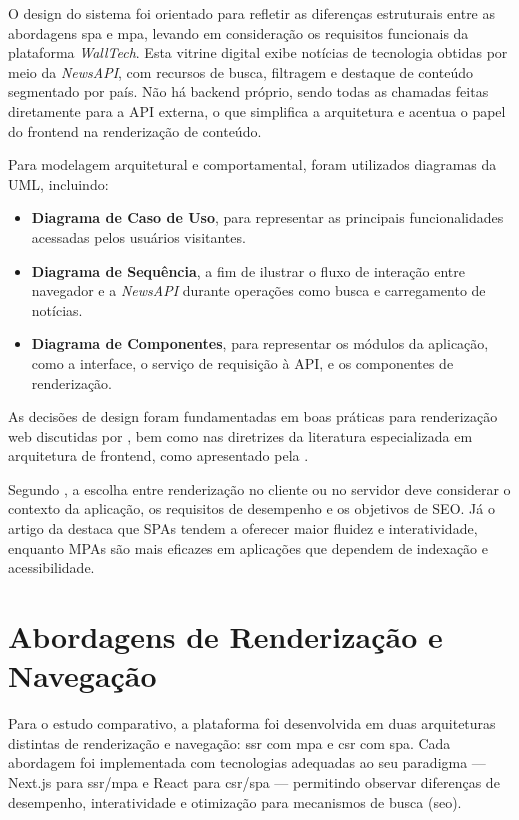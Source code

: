 O design do sistema foi orientado para refletir as diferenças estruturais entre as abordagens \acrshort{spa} e \acrshort{mpa}, levando em consideração os requisitos funcionais da plataforma \textit{WallTech}. Esta vitrine digital exibe notícias de tecnologia obtidas por meio da \textit{NewsAPI}, com recursos de busca, filtragem e destaque de conteúdo segmentado por país. Não há backend próprio, sendo todas as chamadas feitas diretamente para a API externa, o que simplifica a arquitetura e acentua o papel do frontend na renderização de conteúdo.

Para modelagem arquitetural e comportamental, foram utilizados diagramas da UML, incluindo:
\begin{itemize}
  \item \textbf{Diagrama de Caso de Uso}, para representar as principais funcionalidades acessadas pelos usuários visitantes.
  \item \textbf{Diagrama de Sequência}, a fim de ilustrar o fluxo de interação entre navegador e a \textit{NewsAPI} durante operações como busca e carregamento de notícias.
  \item \textbf{Diagrama de Componentes}, para representar os módulos da aplicação, como a interface, o serviço de requisição à API, e os componentes de renderização.
\end{itemize}

As decisões de design foram fundamentadas em boas práticas para renderização web discutidas por \cite{osmani2025}, bem como nas diretrizes da literatura especializada em arquitetura de frontend, como apresentado pela \cite{atori2024}.

Segundo \cite{osmani2025}, a escolha entre renderização no cliente ou no servidor deve considerar o contexto da aplicação, os requisitos de desempenho e os objetivos de SEO. Já o artigo da \cite{atori2024} destaca que SPAs tendem a oferecer maior fluidez e interatividade, enquanto MPAs são mais eficazes em aplicações que dependem de indexação e acessibilidade.

\section{Abordagens de Renderização e Navegação}
\label{section:abordagens-renderizacao}

Para o estudo comparativo, a plataforma foi desenvolvida em duas arquiteturas distintas de renderização e navegação: 
\acrfull{ssr} com \acrfull{mpa} e \acrfull{csr} com \acrfull{spa}.  
Cada abordagem foi implementada com tecnologias adequadas ao seu paradigma — Next.js para \acrshort{ssr}/\acrshort{mpa} e React para \acrshort{csr}/\acrshort{spa} — permitindo observar diferenças de desempenho, interatividade e otimização para mecanismos de busca (\acrshort{seo}).

